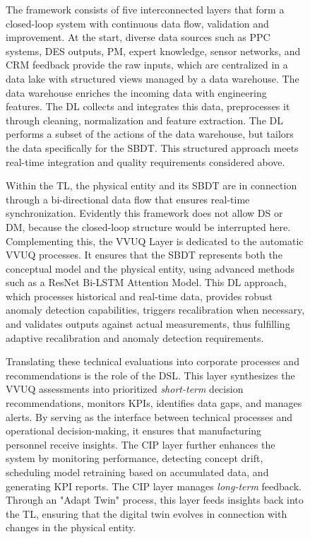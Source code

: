 \begin{figure}[htbp]
The framework consists of five interconnected layers that form a closed-loop system with continuous data flow, validation and improvement. At the start, diverse data sources such as PPC systems, DES outputs, PM, expert knowledge, sensor networks, and CRM feedback provide the raw inputs, which are centralized in a data lake with structured views managed by a data warehouse. The data warehouse enriches the incoming data with engineering features. The DL collects and integrates this data, preprocesses it through cleaning, normalization and feature extraction. The DL performs a subset of the actions of the data warehouse, but tailors the data specifically for the SBDT. This structured approach meets real-time integration and quality requirements considered above.

Within the TL, the physical entity and its SBDT are in connection through a bi-directional data flow that ensures real-time synchronization. Evidently this framework does not allow DS or DM, because the closed-loop structure would be interrupted here. Complementing this, the VVUQ Layer is dedicated to the automatic VVUQ processes. It ensures that the SBDT represents both the conceptual model and the physical entity, using advanced methods such as a ResNet Bi-LSTM Attention Model. This DL approach, which processes historical and real-time data, provides robust anomaly detection capabilities, triggers recalibration when necessary, and validates outputs against actual measurements, thus fulfilling adaptive recalibration and anomaly detection requirements.

Translating these technical evaluations into corporate processes and recommendations is the role of the DSL. This layer synthesizes the VVUQ assessments into prioritized \textit{short-term} decision recommendations, monitors KPIs, identifies data gaps, and manages alerts. By serving as the interface between technical processes and operational decision-making, it ensures that manufacturing personnel receive insights. The CIP layer further enhances the system by monitoring performance, detecting concept drift, scheduling model retraining based on accumulated data, and generating KPI reports. The CIP layer manages \textit{long-term} feedback. Through an "Adapt Twin" process, this layer feeds insights back into the TL, ensuring that the digital twin evolves in connection with changes in the physical entity.


\end{figure}

